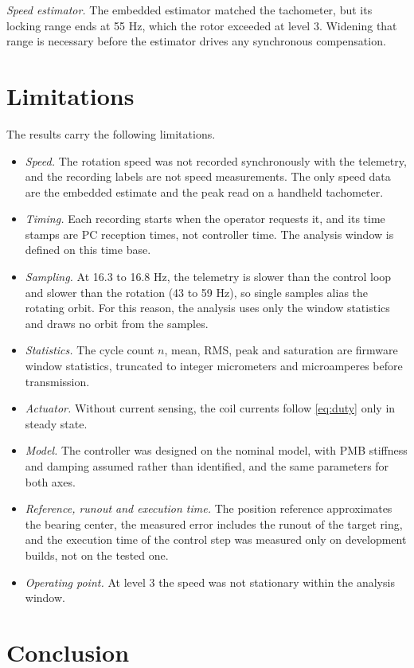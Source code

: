 \documentclass[conference]{IEEEtran}
\begin{document}
\emph{Speed estimator.} The embedded estimator matched the tachometer, but its locking range ends at 55 Hz, which the rotor exceeded at level 3. Widening that range is necessary before the estimator drives any synchronous compensation.

\section{Limitations}\label{sec:limitations}

The results carry the following limitations.
\begin{itemize}
\item \emph{Speed.} The rotation speed was not recorded synchronously with the telemetry, and the recording labels are not speed measurements. The only speed data are the embedded estimate and the peak read on a handheld tachometer.
\item \emph{Timing.} Each recording starts when the operator requests it, and its time stamps are PC reception times, not controller time. The analysis window is defined on this time base.
\item \emph{Sampling.} At 16.3 to 16.8 Hz, the telemetry is slower than the control loop and slower than the rotation (43 to 59 Hz), so single samples alias the rotating orbit. For this reason, the analysis uses only the window statistics and draws no orbit from the samples.
\item \emph{Statistics.} The cycle count $n$, mean, RMS, peak and saturation are firmware window statistics, truncated to integer micrometers and microamperes before transmission.
\item \emph{Actuator.} Without current sensing, the coil currents follow \eqref{eq:duty} only in steady state.
\item \emph{Model.} The controller was designed on the nominal model, with PMB stiffness and damping assumed rather than identified, and the same parameters for both axes.
\item \emph{Reference, runout and execution time.} The position reference approximates the bearing center, the measured error includes the runout of the target ring, and the execution time of the control step was measured only on development builds, not on the tested one.
\item \emph{Operating point.} At level 3 the speed was not stationary within the analysis window.
\end{itemize}

\section{Conclusion}\label{sec:conclusion}
\end{document}
